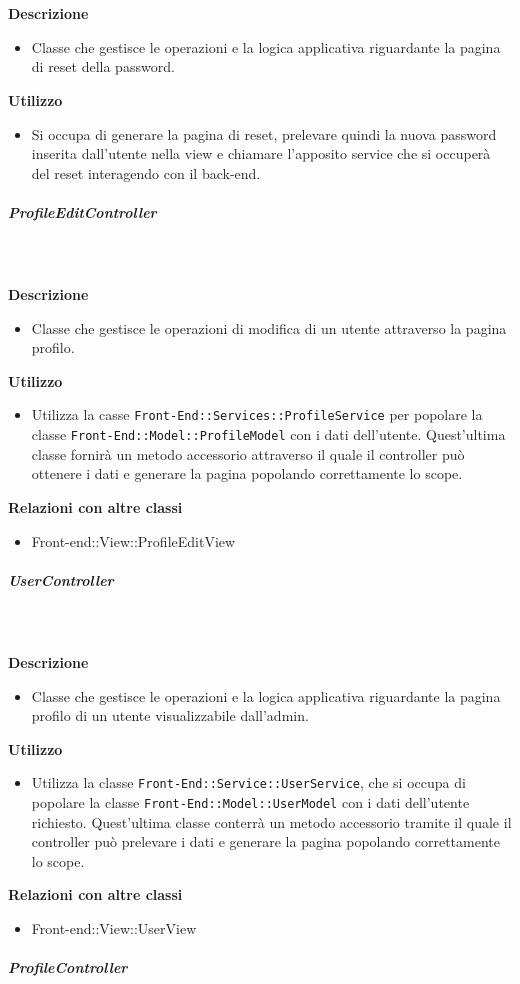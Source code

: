 				\textbf{\\ \\ Descrizione} 
					\begin{itemize}
						\item[] Classe che gestisce le operazioni e la logica applicativa riguardante la pagina di reset della password.
					\end{itemize}      
				\textbf{Utilizzo}  
					\begin{itemize}
						\item[] Si occupa di generare la pagina di reset, prelevare quindi la nuova password inserita dall'utente nella view e chiamare l'apposito service che si occuperà del reset interagendo con il back-end.
					\end{itemize}
			\subparagraph{ProfileEditController}
				
				\textbf{\\ \\ Descrizione} 
					\begin{itemize}
						\item[] Classe che gestisce le operazioni di modifica di un utente attraverso la pagina profilo.
					\end{itemize}      
				\textbf{Utilizzo}  
					\begin{itemize}
						\item[] Utilizza la casse \texttt{Front-End::Services::ProfileService} per popolare la classe \texttt{Front-End::Model::ProfileModel} con i dati dell'utente. Quest'ultima classe fornirà un metodo accessorio attraverso il quale il controller può ottenere i dati e generare la pagina popolando correttamente lo scope.
					\end{itemize}
					\textbf{Relazioni con altre classi}
					\begin{itemize}
							\item{Front-end::View::ProfileEditView}
					\end{itemize}
			\subparagraph{UserController}
				
				\textbf{\\ \\ Descrizione} 
					\begin{itemize}
						\item[] Classe che gestisce le operazioni e la logica applicativa riguardante la pagina profilo di un utente visualizzabile dall'admin.
					\end{itemize}      
				\textbf{Utilizzo}  
					\begin{itemize}
						\item[] Utilizza la classe \texttt{Front-End::Service::UserService}, che si occupa di popolare la classe \texttt{Front-End::Model::UserModel} con i dati dell'utente richiesto. Quest'ultima classe conterrà un metodo accessorio tramite il quale il controller può prelevare i dati e generare la pagina popolando correttamente lo scope.
					\end{itemize}
					\textbf{Relazioni con altre classi}
					\begin{itemize}
							\item{Front-end::View::UserView}
					\end{itemize}
			\subparagraph{ProfileController}
				
